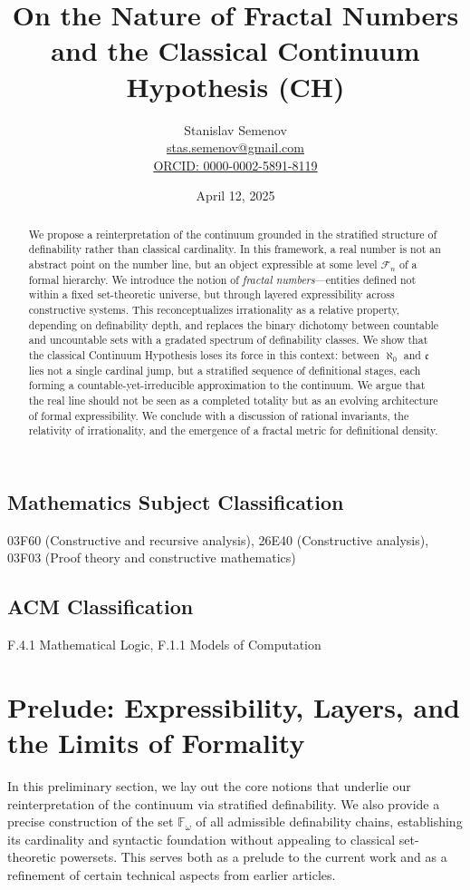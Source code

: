 \documentclass[12pt]{article}
\title{On the Nature of Fractal Numbers and the Classical Continuum Hypothesis (CH)}
\author{Stanislav Semenov \\
\href{mailto:stas.semenov@gmail.com}{stas.semenov@gmail.com} \\
\href{https://orcid.org/0000-0002-5891-8119}{ORCID: 0000-0002-5891-8119}}
\date{April 12, 2025}
\theoremstyle{definition}
\theoremstyle{plain}
\theoremstyle{remark}
\begin{document}
\maketitle

\begin{abstract}
We propose a reinterpretation of the continuum grounded in the stratified structure of definability rather than classical cardinality. In this framework, a real number is not an abstract point on the number line, but an object expressible at some level \( \mathcal{F}_n \) of a formal hierarchy. We introduce the notion of \emph{fractal numbers}—entities defined not within a fixed set-theoretic universe, but through layered expressibility across constructive systems. This reconceptualizes irrationality as a relative property, depending on definability depth, and replaces the binary dichotomy between countable and uncountable sets with a gradated spectrum of definability classes. We show that the classical Continuum Hypothesis loses its force in this context: between \( \aleph_0 \) and \( \mathfrak{c} \) lies not a single cardinal jump, but a stratified sequence of definitional stages, each forming a countable-yet-irreducible approximation to the continuum. We argue that the real line should not be seen as a completed totality but as an evolving architecture of formal expressibility. We conclude with a discussion of rational invariants, the relativity of irrationality, and the emergence of a fractal metric for definitional density.
\end{abstract}

\subsection*{Mathematics Subject Classification}
03F60 (Constructive and recursive analysis), 26E40 (Constructive analysis), 03F03 (Proof theory and constructive mathematics)

\subsection*{ACM Classification}
F.4.1 Mathematical Logic, F.1.1 Models of Computation

\section{Prelude: Expressibility, Layers, and the Limits of Formality}

In this preliminary section, we lay out the core notions that underlie our reinterpretation of the continuum via stratified definability. We also provide a precise construction of the set \( \mathbb{F}_\omega \) of all admissible definability chains, establishing its cardinality and syntactic foundation without appealing to classical set-theoretic powersets. This serves both as a prelude to the current work and as a refinement of certain technical aspects from earlier articles.
\end{document}
